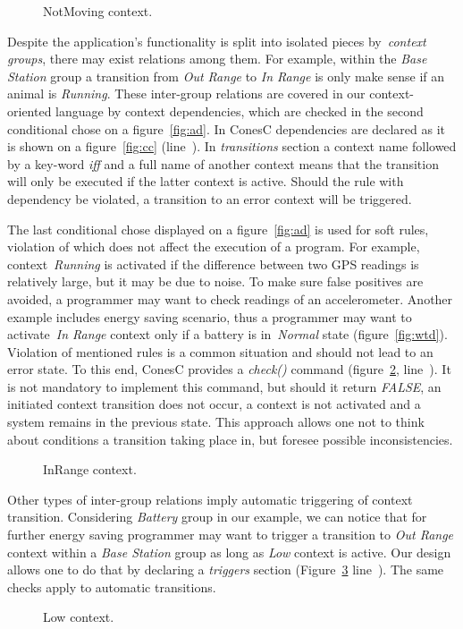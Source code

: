 
\begin{figure}[!h]
\TheSbox
\caption{NotMoving context.}
\label{fig:nmc}
\end{figure}

Despite the application's  functionality is split into isolated pieces by~\emph{context groups},
there may exist relations among them. For example, within the 
\emph{Base Station} group a transition from \emph{Out Range} to \emph{In Range} is only
make sense if an animal is \emph{Running}. These inter-group relations are covered in our
context-oriented language by context dependencies, which are checked in the second
conditional chose on a figure~\ref{fig:ad}. In ConesC dependencies are declared as it is shown on a
figure~\ref{fig:cc} (line~). In \emph{transitions} section a context name
followed by a key-word \emph{iff} and a full name of another context means that
the transition will only be executed if the latter context is active. Should the rule with dependency
be violated, a transition to an error context will be triggered.

The last conditional chose displayed on a figure~\ref{fig:ad} is used for soft rules, violation of
which does not affect the execution of a program. For example, context~\emph{Running} is
activated if the difference between two GPS readings is relatively large, but it may be due to noise.
To make sure false positives are avoided, a programmer may want to check
readings of an accelerometer. Another example includes energy saving scenario,
thus a programmer may want to activate~\emph{In Range} context only if a battery is
in~\emph{Normal} state (figure~\ref{fig:wtd}).
Violation of mentioned rules is a common situation and should not lead to an error state.
To this end, ConesC provides a \emph{check()} command
(figure~\ref{fig:irc}, line~). It is not mandatory to implement this command, but
should it return \emph{FALSE}, an initiated context transition does not occur,
a context is not activated and a system remains in the previous state.
This approach allows one not to think about conditions a transition taking
place in, but foresee possible inconsistencies.


\begin{figure}[!h]
\TheSbox
\caption{InRange context.}
\label{fig:irc}
\end{figure}

Other types of inter-group relations imply automatic triggering of context
transition. Considering \emph{Battery} group in our example, we can notice that
for further energy saving programmer may want to trigger a transition to
\emph{Out Range} context within a \emph{Base Station} group as long as
\emph{Low} context is active. Our design allows one to do that by declaring a
\emph{triggers} section (Figure~\ref{fig:lc} line~). The same checks apply to
automatic transitions.


\begin{figure}[!h]
\TheSbox
\caption{Low context.}
\label{fig:lc}
\end{figure}
